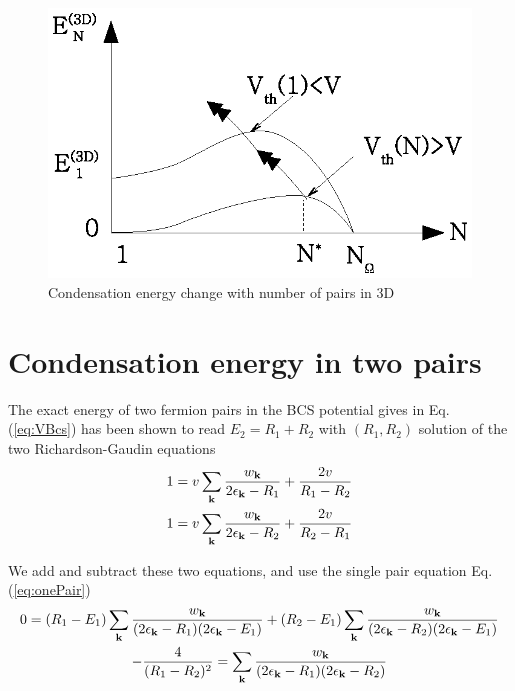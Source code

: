 \documentclass{article}
\begin{document}
\begin{figure}[htb]
	\centering
		\includegraphics{3dCondChange.eps}
	\caption{Condensation energy change with number of pairs in 3D}
	\label{fig:3dCondChange}
\end{figure}

\section{Condensation energy in two pairs\label{sec:twoPair}}
The exact energy of two fermion pairs in the BCS potential gives in Eq. (\ref{eq:VBcs}) has been shown to read $E_2=R_1+R_2$ with $(R_1,R_2)$ solution of the two Richardson-Gaudin equations
\begin{equation}
\begin{split}
1&=v\sum_{\mathbf{k}}\frac{w_{\mathbf{k}}}{2\epsilon_{\mathbf{k}}-R_1}+\frac{2v}{R_1-R_2}\\
1&=v\sum_{\mathbf{k}}\frac{w_{\mathbf{k}}}{2\epsilon_{\mathbf{k}}-R_2}+\frac{2v}{R_2-R_1}
\end{split}
\label{eq:richardsonEq}
\end{equation}

We add and subtract these two equations, and use the single pair equation Eq. (\ref{eq:onePair})
\begin{gather}
0=(R_1-E_1)\sum_{\mathbf{k}}\frac{w_{\mathbf{k}}}{(2\epsilon_{\mathbf{k}}-R_1)(2\epsilon_{\mathbf{k}}-E_1)}+(R_2-E_1)\sum_{\mathbf{k}}\frac{w_{\mathbf{k}}}{(2\epsilon_{\mathbf{k}}-R_2)(2\epsilon_{\mathbf{k}}-E_1)}\label{eq:2PairPlus}\\
-\frac{4}{(R_1-R_2)^2}=\sum_{\mathbf{k}}\frac{w_{\mathbf{k}}}{(2\epsilon_{\mathbf{k}}-R_1)(2\epsilon_{\mathbf{k}}-R_2)}\label{eq:2PairMinus}
\end{gather}
\end{document}
